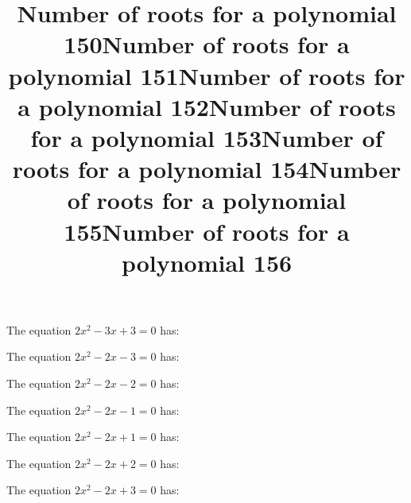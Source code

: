 \documentclass{article}
\begin{document}
\begin{category}
\begin{question}[multichoice]
\end{question}
\begin{question}[multichoice]
\title{Number of roots for a polynomial 150}
The equation $2 x^{2} - 3 x + 3=0$ has:


\end{question}
\begin{question}[multichoice]
\title{Number of roots for a polynomial 151}
The equation $2 x^{2} - 2 x - 3=0$ has:


\end{question}
\begin{question}[multichoice]
\title{Number of roots for a polynomial 152}
The equation $2 x^{2} - 2 x - 2=0$ has:


\end{question}
\begin{question}[multichoice]
\title{Number of roots for a polynomial 153}
The equation $2 x^{2} - 2 x - 1=0$ has:


\end{question}
\begin{question}[multichoice]
\title{Number of roots for a polynomial 154}
The equation $2 x^{2} - 2 x + 1=0$ has:


\end{question}
\begin{question}[multichoice]
\title{Number of roots for a polynomial 155}
The equation $2 x^{2} - 2 x + 2=0$ has:


\end{question}
\begin{question}[multichoice]
\title{Number of roots for a polynomial 156}
The equation $2 x^{2} - 2 x + 3=0$ has:


\end{question}
\end{category}
\end{document}
